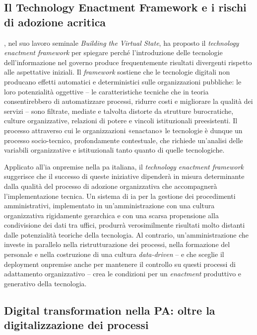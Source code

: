 \subsection{Il Technology Enactment Framework e i rischi di adozione acritica}

\textcite{Fountain2001}, nel suo lavoro seminale \textit{Building the Virtual State}, ha proposto il \textit{technology enactment framework} per spiegare perché l'introduzione delle tecnologie dell'informazione nel governo produce frequentemente risultati divergenti rispetto alle aspettative iniziali. Il \textit{framework} sostiene che le tecnologie digitali non producano effetti automatici e deterministici sulle organizzazioni pubbliche: le loro potenzialità oggettive -- le caratteristiche tecniche che in teoria consentirebbero di automatizzare processi, ridurre costi e migliorare la qualità dei servizi -- sono filtrate, mediate e talvolta distorte da strutture burocratiche, culture organizzative, relazioni di potere e vincoli istituzionali preesistenti. Il processo attraverso cui le organizzazioni «enactano» le tecnologie è dunque un processo socio-tecnico, profondamente contestuale, che richiede un'analisi delle variabili organizzative e istituzionali tanto quanto di quelle tecnologiche.

Applicato all'\gls{ia} \gls{onpremise} nella \gls{pa} italiana, il \textit{technology enactment framework} suggerisce che il successo di queste iniziative dipenderà in misura determinante dalla qualità del processo di adozione organizzativa che accompagnerà l'implementazione tecnica. Un sistema di \gls{ia} per la gestione dei procedimenti amministrativi, implementato in un'amministrazione con una cultura organizzativa rigidamente gerarchica e con una scarsa propensione alla condivisione dei dati tra uffici, produrrà verosimilmente risultati molto distanti dalle potenzialità teoriche della tecnologia. Al contrario, un'amministrazione che investe in parallelo nella ristrutturazione dei processi, nella formazione del personale e nella costruzione di una cultura \textit{data-driven} -- e che sceglie il deployment \gls{onpremise} anche per mantenere il controllo su questi processi di adattamento organizzativo -- crea le condizioni per un \textit{enactment} produttivo e generativo della tecnologia.

\subsection{Digital transformation nella PA: oltre la digitalizzazione dei processi}

